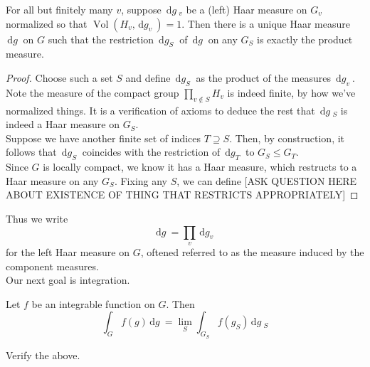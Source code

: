 \documentclass[11pt, x11names, openany]{book}
\newcommand{\dg}{\, \mathrm{d}g \ }
\renewcommand{\d}[1]{\, \mathrm{d}#1 \ }
\DeclareMathOperator{\vol}{Vol}
\begin{document}
\begin{prop}
\label{Haar Measure on restricted product}
For all but finitely many $v$, suppose $\dg_v$ be a (left) Haar measure on $G_v$ normalized so that $\vol(H_v, \d{g_v}) = 1$. Then there is a unique Haar measure $\dg$ on $G$ such that the restriction $\d{g_S}$ of $\dg$ on any $G_S$ is exactly the product measure.
\end{prop}
\begin{proof}
Choose such a set $S$ and define $\d{g_S}$ as the product of the measures $\d{g_v}$. Note the measure of the compact group $\prod_{v \notin S} H_v$ is indeed finite, by how we've normalized things. It is a verification of axioms to deduce the rest that $\dg_S$ is indeed a Haar measure on $G_S$.\\
Suppose we have another finite set of indices $T \supseteq S$. Then, by construction,
it follows that $\d{g_S}$ coincides with the restriction of $\d{g_T}$ to $G_S \leq G_T$.\\

Since $G$ is locally compact, we know it has a Haar measure, which restructs to a Haar measure on any $G_S$. Fixing any $S$, we can define [ASK QUESTION HERE ABOUT EXISTENCE OF THING THAT RESTRICTS APPROPRIATELY]
\end{proof}

Thus we write 
\begin{equation}
\label{eqn: measure on restricted product}
    \dg = \prod_v \d{g_v}
\end{equation}
for the left Haar measure on $G$, oftened referred to as the measure induced by the component measures.\\

Our next goal is integration.
\begin{prop}
\label{Restricted Product Integral is limit of finite integrals}

Let $f$ be an integrable function on $G$. Then
\begin{equation*}
    \int_G f(g) \dg = \lim_S \int_{G_S}f(g_S) \dg_S
\end{equation*}

\end{prop}

\begin{exercise}
    Verify the above.
\end{exercise}
\end{document}

